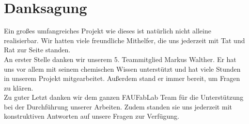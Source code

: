 \section{Danksagung}

Ein großes umfangreiches Projekt wie dieses ist natürlich nicht alleine realisierbar. Wir hatten viele freundliche Mithelfer, die uns jederzeit mit Tat und Rat zur Seite standen.\\

An erster Stelle danken wir unserem 5. Teammitglied Markus Walther. Er hat uns vor allem mit seinem chemischen Wissen unterstützt und hat viele Stunden in unserem Projekt mitgearbeitet. Außerdem stand er immer bereit, um Fragen zu klären.\\

Zu guter Letzt danken wir dem ganzen FAUFabLab Team für die Unterstützung bei der Durchführung unserer Arbeiten. Zudem standen sie uns jederzeit mit konstruktiven Antworten auf unsere Fragen zur Verfügung.
